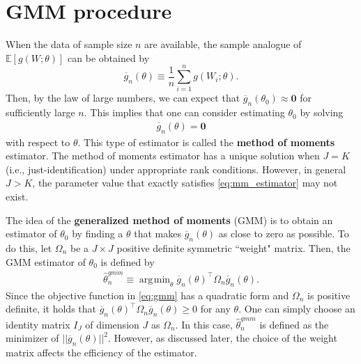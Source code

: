 \documentclass[10.5pt, A4paper, openany, uplatex]{book}
\newcommand{\mbf}{\mathbf}
\newcommand{\E}{\mathbb{E}}
\renewcommand{\hat}{\widehat}
\renewcommand{\bar}{\overline}
\numberwithin{equation}{section}
\DeclareMathOperator*{\argmin}{\arg\!\min}
\begin{document}
\section{GMM procedure}
When the data of sample size $n$ are available, the sample analogue of $\E [g(W; \theta)]$ can be obtained by
\[
	\bar{g}_n(\theta) \equiv \frac{1}{n}\sum_{i = 1}^n g(W_i; \theta).
\]
Then, by the law of large numbers, we can expect that $\bar{g}_n(\theta_0) \approx \mbf{0}$ for sufficiently large $n$.
This implies that one can consider estimating $\theta_0$ by solving
\begin{align}\label{eq:mm_estimator}
	\bar{g}_n(\theta) = \mbf{0}
\end{align}
with respect to $\theta$.
This type of estimator is called the \textbf{method of moments} estimator.
The method of moments estimator has a unique solution when $J = K$ (i.e., just-identification) under appropriate rank conditions.
However, in general $J > K$, the parameter value that exactly satisfies \eqref{eq:mm_estimator} may not exist.

The idea of the \textbf{generalized method of moments} (GMM) is to obtain an estimator of $\theta_0$ by finding a $\theta$ that makes $\bar{g}_n(\theta)$ as close to zero as possible. 
To do this, let $\Omega_n$ be a $J \times J$ positive definite symmetric ``weight" matrix.
Then, the GMM estimator of $\theta_0$ is defined by
\begin{align}\label{eq:gmm}
	\hat{\theta}_n^{gmm} \equiv \argmin_{\theta} \bar{g}_n(\theta)^\top \Omega_n \bar{g}_n(\theta).
\end{align}
Since the objective function in \eqref{eq:gmm} has a quadratic form and $\Omega_n$ is positive definite, it holds that $\bar{g}_n(\theta)^\top \Omega_n \bar{g}_n(\theta) \geq 0$ for any $\theta$.
One can simply choose an identity matrix $I_J$ of dimension $J$ as $\Omega_n$.
In this case, $\hat{\theta}_n^{gmm}$ is defined as the minimizer of $||\bar{g}_n(\theta) ||^2$.
However, as discussed later, the choice of the weight matrix affects the efficiency of the estimator.
\end{document}
